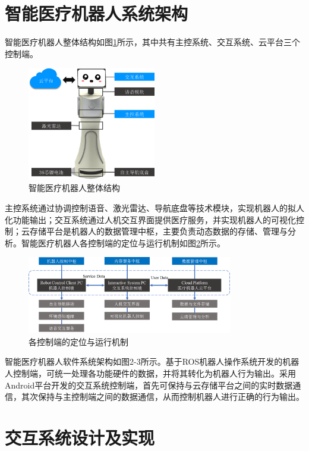 \documentclass[UTF8]{XJTUthesis}
\begin{document}
\section{智能医疗机器人系统架构}
智能医疗机器人整体结构如图\ref{overall_struct}所示，其中共有主控系统、交互系统、云平台三个控制端。
\begin{figure}[htbp]
  \centering
  \includegraphics[width=0.5\textwidth]{example//overallstruct.png}
  \caption{智能医疗机器人整体结构}\label{overall_struct}
\end{figure}
主控系统通过协调控制语音、激光雷达、导航底盘等技术模块，实现机器人的拟人化功能输出；交互系统通过人机交互界面提供医疗服务，并实现机器人的可视化控制；云存储平台是机器人的数据管理中枢，主要负责动态数据的存储、管理与分析。智能医疗机器人各控制端的定位与运行机制如图\ref{flowchart}所示。\par
\begin{figure}[htbp]
  \centering
  \includegraphics[width=0.8\textwidth]{example//flowchart.png}
  \caption{各控制端的定位与运行机制}\label{flowchart}
\end{figure}
智能医疗机器人软件系统架构如图2-3所示。基于ROS机器人操作系统开发的机器人控制端，可统一处理各功能硬件的数据，并将其转化为机器人行为输出。采用Android平台开发的交互系统控制端，首先可保持与云存储平台之间的实时数据通信，其次保持与主控制端之间的数据通信，从而控制机器人进行正确的行为输出。

\section{交互系统设计及实现}
\end{document}
